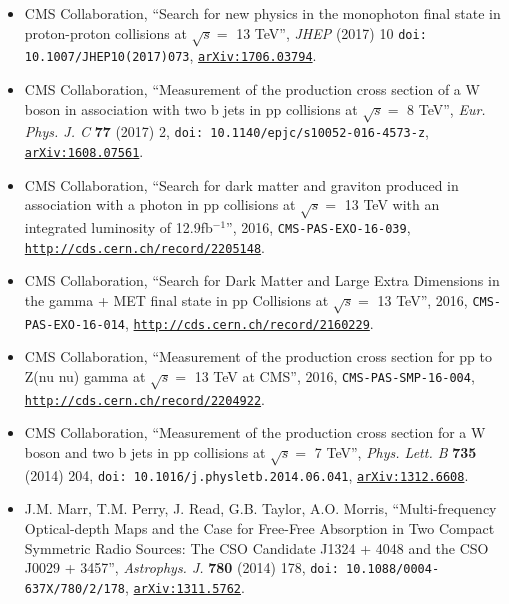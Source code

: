 \documentclass[10pt]{article} %
\begin{document}
\begin{itemize}

\item CMS Collaboration, 
  ``Search for new physics in the monophoton final state in proton-proton collisions at $\sqrt{s}=$ 13 TeV'',
  \emph{JHEP} (2017) 10
  \texttt{doi: 10.1007/JHEP10(2017)073},
  \texttt{\href{http://arxiv.org/abs/1706.03794}{arXiv:1706.03794}}.

\item CMS Collaboration, 
  ``Measurement of the production cross section of a W boson
  in association with two b jets in pp collisions at $\sqrt{s}=$ 8 TeV'',
  \emph{Eur. Phys. J. C} {\bf 77} (2017) 2, 
  \texttt{doi: 10.1140/epjc/s10052-016-4573-z},
  \texttt{\href{http://arxiv.org/abs/1608.07561}{arXiv:1608.07561}}.

\item CMS Collaboration, 
  ``Search for dark matter and graviton produced in
  association with a photon in pp collisions at $\sqrt{s}=$ 13 TeV
  with an integrated luminosity of 12.9fb$^{-1}$'',
  2016,
  \texttt{CMS-PAS-EXO-16-039},
  \texttt{\href{http://cds.cern.ch/record/2205148}{http://cds.cern.ch/record/2205148}}.

\item CMS Collaboration, 
  ``Search for Dark Matter and Large Extra Dimensions in the
  gamma + MET final state in pp Collisions at $\sqrt{s}=$ 13 TeV'',
  2016,
  \texttt{CMS-PAS-EXO-16-014},
  \texttt{\href{http://cds.cern.ch/record/2160229}{http://cds.cern.ch/record/2160229}}.

\item CMS Collaboration, 
  ``Measurement of the production cross section for pp to 
  Z(nu nu) gamma at $\sqrt{s}=$ 13 TeV at CMS'', 2016,
  \texttt{CMS-PAS-SMP-16-004},
  \texttt{\href{http://cds.cern.ch/record/2204922}{http://cds.cern.ch/record/2204922}}.

\item CMS Collaboration, 
  ``Measurement of the production cross section for a W boson
  and two b jets in pp collisions at $\sqrt{s}=$ 7 TeV'',
  \emph{Phys. Lett. B} {\bf 735} (2014) 204, 
  \texttt{doi: 10.1016/j.physletb.2014.06.041},
  \texttt{\href{http://arxiv.org/abs/1312.6608}{arXiv:1312.6608}}.

\item J.M. Marr, T.M. Perry, J. Read, G.B. Taylor, A.O. Morris, 
  ``Multi-frequency Optical-depth Maps and the Case for
  Free-Free Absorption in Two Compact Symmetric Radio
  Sources: The CSO Candidate J1324 + 4048 and the CSO J0029
  + 3457'',
  \emph{Astrophys. J.} {\bf 780} (2014) 178, 
  \texttt{doi: 10.1088/0004-637X/780/2/178},
  \texttt{\href{http://arxiv.org/abs/1311.5762}{arXiv:1311.5762}}.


\end{itemize}
\end{document}
